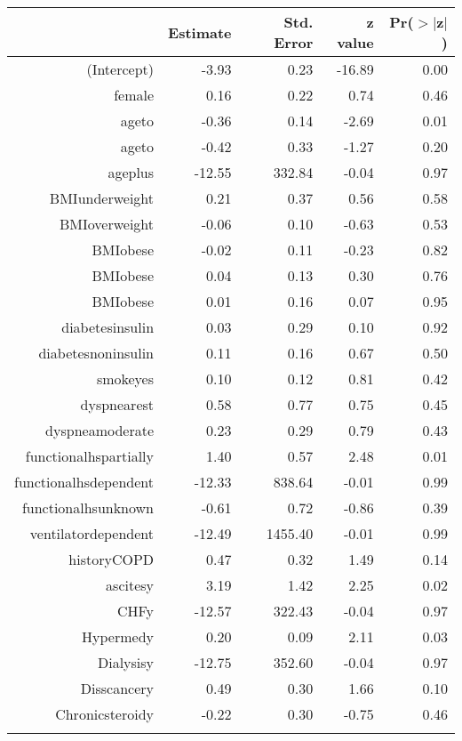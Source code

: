 \bigskip\bigskip
\centering
\begin{tabular}{rrrrr}
  \hline
 & Estimate & Std. Error & z value & Pr($>$$|$z$|$) \\ 
  \hline
(Intercept) & -3.93 & 0.23 & -16.89 & 0.00 \\ 
  female & 0.16 & 0.22 & 0.74 & 0.46 \\ 
  age\-65\-to\-74 & -0.36 & 0.14 & -2.69 & 0.01 \\ 
  age\-75\-to\-84 & -0.42 & 0.33 & -1.27 & 0.20 \\ 
  age\-85\-plus & -12.55 & 332.84 & -0.04 & 0.97 \\ 
  BMI\-underweight & 0.21 & 0.37 & 0.56 & 0.58 \\ 
  BMI\-overweight & -0.06 & 0.10 & -0.63 & 0.53 \\ 
  BMI\-obese\-1 & -0.02 & 0.11 & -0.23 & 0.82 \\ 
  BMI\-obese\-2 & 0.04 & 0.13 & 0.30 & 0.76 \\ 
  BMI\-obese\-3 & 0.01 & 0.16 & 0.07 & 0.95 \\ 
  diabetes\-insulin & 0.03 & 0.29 & 0.10 & 0.92 \\ 
  diabetes\-noninsulin & 0.11 & 0.16 & 0.67 & 0.50 \\ 
  smoke\-yes & 0.10 & 0.12 & 0.81 & 0.42 \\ 
  dyspnea\-rest & 0.58 & 0.77 & 0.75 & 0.45 \\ 
  dyspnea\-moderate & 0.23 & 0.29 & 0.79 & 0.43 \\ 
  functional\-hs\-partially & 1.40 & 0.57 & 2.48 & 0.01 \\ 
  functional\-hs\-dependent & -12.33 & 838.64 & -0.01 & 0.99 \\ 
  functional\-hs\-unknown & -0.61 & 0.72 & -0.86 & 0.39 \\ 
  ventilator\-dependent & -12.49 & 1455.40 & -0.01 & 0.99 \\ 
  history\-COPD & 0.47 & 0.32 & 1.49 & 0.14 \\ 
  ascites\-y & 3.19 & 1.42 & 2.25 & 0.02 \\ 
  CHF\-y & -12.57 & 322.43 & -0.04 & 0.97 \\ 
  Hyper\-med\-y & 0.20 & 0.09 & 2.11 & 0.03 \\ 
  Dialysis\-y & -12.75 & 352.60 & -0.04 & 0.97 \\ 
  Diss\-cancer\-y & 0.49 & 0.30 & 1.66 & 0.10 \\ 
  Chronic\-steroid\-y & -0.22 & 0.30 & -0.75 & 0.46 \\ 
$$
\end{tabular}

